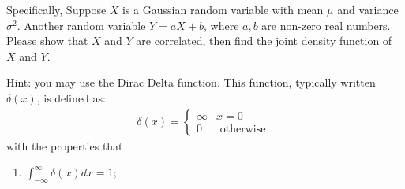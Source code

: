 \begin{exercise}
\begin{enumerate}
            Specifically, Suppose $X$ is a Gaussian random variable with mean $\mu$ and variance $\sigma^2$. Another random variable $Y=aX+b$, where $a,b$ are non-zero real numbers. Please show that $X$ and $Y$ are correlated, then find the joint density function of $X$ and $Y$.
            
            Hint: you may use the Dirac Delta function. This function, typically written $\delta(x)$, is defined as:
            \begin{align*}
                \delta(x)=\left\{\begin{array}{ll}
                                     \infty & x=0                 \\
                                     0      & \text { otherwise }
                                 \end{array}\right.
            \end{align*}
            with the properties that
            \begin{enumerate}
                \item $\int_{-\infty}^{\infty} \delta(x) d x=1;$
                    

\end{enumerate}
\end{enumerate}
\end{exercise}
